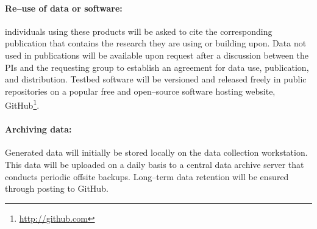 \documentclass[11pt]{article}
\begin{document}
\paragraph{Re--use of data or software:}
individuals using these products will be asked to cite the corresponding publication that contains the research they are using or building upon.
Data not used in publications will be available upon request after a discussion between the PIs and the requesting group to establish an agreement for data use, publication, and distribution.
Testbed software will be versioned and released freely in public repositories on a popular free and open--source software hosting website, GitHub\footnote{\url{http://github.com}}.


\paragraph{Archiving data:}
Generated data will initially be stored locally on the data collection workstation. This data will be uploaded on a daily basis to a central data archive server that conducts periodic offsite backups.
Long--term data retention will be ensured through posting to GitHub.



\pagebreak
\setcounter{page}{1}

\end{document}

